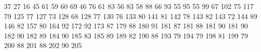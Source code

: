 37 27
16 45
61 59
60 69
46 76
61 83
56 83
58 88
66 93
55 95
55 99
67 102
75 117
79 125
77 127
73 128
68 128
77 130
76 133
80 141
81 142
78 143
82 143
72 144
89 146
82 157
80 164
92 172
92 173
87 179
88 180
91 181
87 181
88 181
90 181
90 182
90 182
89 184
90 185
83 185
89 189
82 190
88 193
79 194
79 198
81 199
79 200
88 201
88 202
90 205
